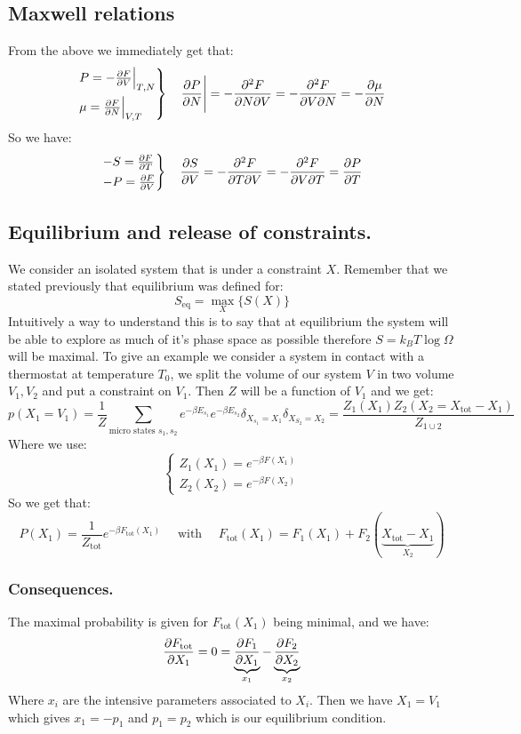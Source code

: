 \documentclass[10pt,a4paper]{book}
\begin{document}
\subsection{Maxwell relations}
From the above we immediately get that:
\[
\begin{rcases}
P = - \pdv{F}{V} \Big|_{T, N}\\
\mu = \pdv{F}{N} \Big|_{V,T}
\end{rcases}
\quad \pdv{P}{N} \Bigg| = -\pdv[2]{F}{N}{V} = - \pdv[2]{F}{V}{N} = -\pdv{\mu}{N}
\]
So we have:
\[
\begin{rcases}
-S = \pdv{F}{T}\\
-P = \pdv{F}{V}
\end{rcases}\quad \pdv{S}{V} = - \pdv[2]{F}{T}{V} = -\pdv[2]{F}{V}{T} = \pdv{P}{T}
\]

\subsection{Equilibrium and release of constraints.}
We consider an isolated system that is under a constraint $X$. Remember that we stated previously that equilibrium was defined for:
\[
S_\text{eq} = \max_X \{S(X)\}
\]
Intuitively a way to understand this is to say that at equilibrium the system will be able to explore as much of it's phase space as possible therefore $S = k_B T \log \Omega$ will be maximal. To give an example we consider a system in contact with a thermostat at temperature $T_0$, we split the volume of our system $V$ in two volume $V_1,V_2$ and put a constraint on $V_1$. Then $Z$ will be a function of $V_1$ and we get:
\[
p(X_1 = V_1) = \frac{1}{Z} \sum_{\text{micro states } s_1, s_2} e^{-\beta E_{s_1}} e^{- \beta E_{s_2}} \delta_{X_{s_1} = X_1} \delta_{X_{S_2} = X_2} = \frac{Z_1(X_1)Z_2(X_2 = X_\text{tot} - X_1)}{Z_{1 \cup 2}}
\]
Where we use:
\[
\begin{cases}
Z_1(X_1) = e^{-\beta F(X_1)}\\
Z_2(X_2) = e^{-\beta F(X_2)}
\end{cases}
\]
So we get that:
\[
P(X_1) = \frac{1}{Z_\text{tot}} e^{-\beta F_\text{tot}(X_1)} \quad \text{ with } \quad F_\text{tot}(X_1) = F_1(X_1) + F_2(\underbrace{X_\text{tot} - X_1}_{X_2})
\]
\subsubsection{Consequences.}
The maximal probability is given for $F_\text{tot}(X_1)$ being minimal, and we have:
\[
\pdv{F_\text{tot}}{X_1} = 0 = \underbrace{\pdv{F_1}{X_1}}_{x_1} - \underbrace{\pdv{F_2}{X_2}}_{x_2}
\]
Where $x_i$ are the intensive parameters associated to $X_i$. Then we have $X_1 =V_1$ which gives $x_1 = -p_1$ and $p_1 = p_2$ which is our equilibrium condition.
\end{document}
